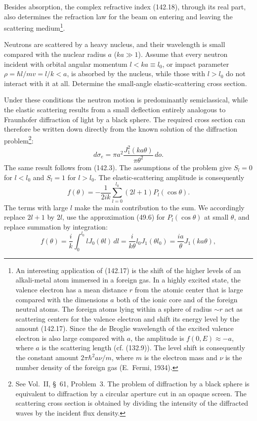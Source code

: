 Besides absorption, the complex refractive index (142.18), through its real part, also determines the refraction law for the beam on entering and leaving the scattering medium\footnote{An interesting application of (142.17) is the shift of the higher levels of an alkali-metal atom immersed in a foreign gas. In a highly excited state, the valence electron has a mean distance $r$ from the atomic center that is large compared with the dimensions $a$ both of the ionic core and of the foreign neutral atoms. The foreign atoms lying within a sphere of radius $\sim r$ act as scattering centers for the valence electron and shift its energy level by the amount (142.17). Since the de Broglie wavelength of the excited valence electron is also large compared with $a$, the amplitude is $f(0,E)\approx-a$, where $a$ is the scattering length (cf. (132.9)). The level shift is consequently the constant amount $2\pi\hbar^2a\nu/m$, where $m$ is the electron mass and $\nu$ is the number density of the foreign gas (E.~Fermi, 1934).}.

\ProblemHeading

Neutrons are scattered by a heavy nucleus, and their wavelength is small compared with the nuclear radius $a$ ($ka\gg1$). Assume that every neutron incident with orbital angular momentum $l<ka\equiv l_0$, or impact parameter $\rho=\hbar l/mv=l/k<a$, is absorbed by the nucleus, while those with $l>l_0$ do not interact with it at all. Determine the small-angle elastic-scattering cross section.

\SolutionHeading
Under these conditions the neutron motion is predominantly semiclassical, while the elastic scattering results from a small deflection entirely analogous to Fraunhofer diffraction of light by a black sphere. The required cross section can therefore be written down directly from the known solution of the diffraction problem\footnote{See Vol.~II, §~61, Problem~3. The problem of diffraction by a black sphere is equivalent to diffraction by a circular aperture cut in an opaque screen. The scattering cross section is obtained by dividing the intensity of the diffracted waves by the incident flux density.}:
\[
 d\sigma_e=\pi a^2\frac{J_1^2(ka\theta)}{\pi\theta^2}\,d\mathit{o}.
\]
The same result follows from (142.3). The assumptions of the problem give $S_l=0$ for $l<l_0$ and $S_l=1$ for $l>l_0$. The elastic-scattering amplitude is consequently
\[
 f(\theta)=-\frac1{2ik}\sum_{l=0}^{l_0}(2l+1)P_l(\cos\theta).
\]
The terms with large $l$ make the main contribution to the sum. We accordingly replace $2l+1$ by $2l$, use the approximation (49.6) for $P_l(\cos\theta)$ at small $\theta$, and replace summation by integration:
\[
 f(\theta)=\frac{i}{k}\int_0^{l_0}lJ_0(\theta l)\,dl
 =\frac{i}{k\theta}l_0J_1(\theta l_0)=\frac{ia}{\theta}J_1(ka\theta),
\]

